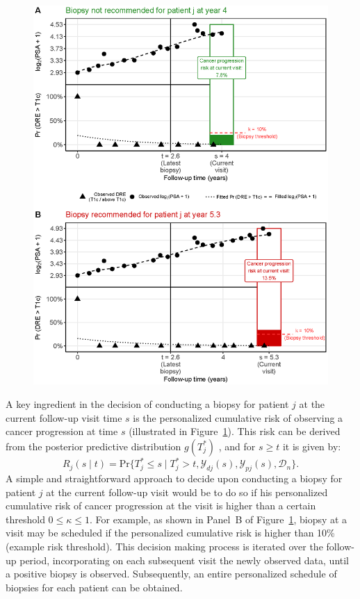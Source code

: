 \documentclass[Afour,sagev,times]{sagej}
\begin{document}
\begin{figure}[!htb]
\captionsetup{justification=justified}
\centerline{\includegraphics[width=\columnwidth]{Figure4.eps}}

\label{Figure4}
\end{figure}

A key ingredient in the decision of conducting a biopsy for patient $j$ at the current follow-up visit time $s$ is the personalized cumulative risk of observing a cancer progression at time $s$ (illustrated in Figure~\ref{Figure4}). This risk can be derived from the posterior predictive distribution $g(T^*_j)$ \cite{rizopoulos2011dynamic}, and for $s \geq t$ it is given by:
\begin{equation}
\label{eq:dynamic_risk_prob}
R_j(s \mid t) = \mbox{Pr}\big\{T^*_j \leq s \mid T^*_j > t, \mathcal{Y}_{dj}(s), \mathcal{Y}_{pj}(s), \mathcal{D}_n\big\}.
\end{equation}
A simple and straightforward approach to decide upon conducting a biopsy for patient $j$ at the current follow-up visit would be to do so if his personalized cumulative risk of cancer progression at the visit is higher than a certain threshold $0 \leq \kappa \leq 1$. For example, as shown in Panel~B of Figure~\ref{Figure4}, biopsy at a visit may be scheduled if the personalized cumulative risk is higher than 10\% (example risk threshold). This decision making process is iterated over the follow-up period, incorporating on each subsequent visit the newly observed data, until a positive biopsy is observed. Subsequently, an entire personalized schedule of biopsies for each patient can be obtained.
\end{document}
